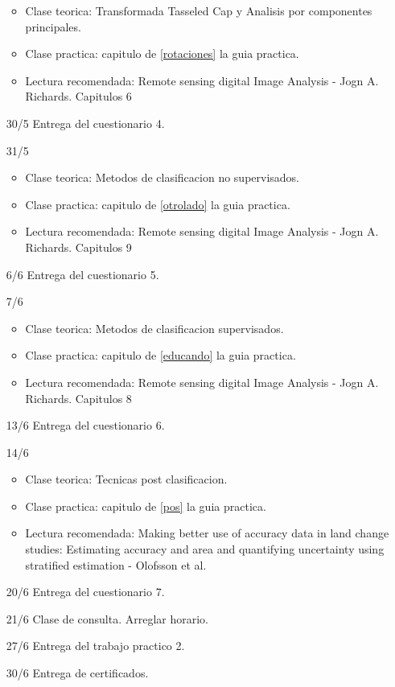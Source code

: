\begin{itemize}
  \begin{itemize}
    \item Clase teorica: Transformada Tasseled Cap y Analisis por componentes principales.
    \item Clase practica: capitulo de \ref{rotaciones} la guia practica.
    \item Lectura recomendada: Remote sensing digital Image Analysis - Jogn A. Richards. Capitulos 6
  \end{itemize}
  \item[30/5] Entrega del cuestionario 4.
  \item[31/5] 
  \begin{itemize}
    \item Clase teorica: Metodos de clasificacion no supervisados.
    \item Clase practica: capitulo de \ref{otrolado} la guia practica.
    \item Lectura recomendada: Remote sensing digital Image Analysis - Jogn A. Richards. Capitulos 9
  \end{itemize}
  \item[6/6] Entrega del cuestionario 5.
  \item[7/6] 
  \begin{itemize}
    \item Clase teorica: Metodos de clasificacion supervisados.
    \item Clase practica: capitulo de \ref{educando} la guia practica.
    \item Lectura recomendada: Remote sensing digital Image Analysis - Jogn A. Richards. Capitulos 8
  \end{itemize}
  \item[13/6] Entrega del cuestionario 6.
  \item[14/6] 
  \begin{itemize}
    \item Clase teorica: Tecnicas post clasificacion.
    \item Clase practica: capitulo de \ref{pos} la guia practica.
    \item Lectura recomendada: Making better use of accuracy data in land change studies: Estimating accuracy and
area and quantifying uncertainty using stratified estimation - Olofsson et al.
  \end{itemize}
  \item[20/6] Entrega del cuestionario 7.
  \item[21/6] Clase de consulta. Arreglar horario.
  \item[27/6] Entrega del trabajo practico 2.
  \item[30/6] Entrega de certificados.
\end{itemize}

